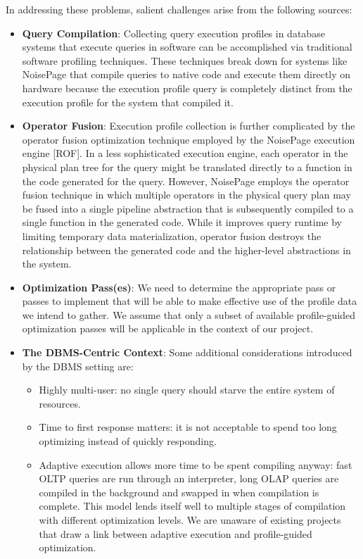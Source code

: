 \documentclass{vldb}
\begin{document}
In addressing these problems, salient challenges arise from the following sources:

\begin{itemize}
    \item \textbf{Query Compilation}: Collecting query execution profiles in database systems that execute queries in software can be accomplished via traditional software profiling techniques. These techniques break down for systems like NoisePage that compile queries to native code and execute them directly on hardware because the execution profile query is completely distinct from the execution profile for the system that compiled it.
    \item \textbf{Operator Fusion}: Execution profile collection is further complicated by the operator fusion optimization technique employed by the NoisePage execution engine [ROF]. In a less sophisticated execution engine, each operator in the physical plan tree for the query might be translated directly to a function in the code generated for the query. However, NoisePage employs the operator fusion technique in which multiple operators in the physical query plan may be fused into a single pipeline abstraction that is subsequently compiled to a single function in the generated code. While it improves query runtime by limiting temporary data materialization, operator fusion destroys the relationship between the generated code and the higher-level abstractions in the system.
    \item \textbf{Optimization Pass(es)}: We need to determine the appropriate pass or passes to implement that will be able to make effective use of the profile data we intend to gather. We assume that only a subset of available profile-guided optimization passes will be applicable in the context of our project.
    \item \textbf{The DBMS-Centric Context}: Some additional considerations introduced by the DBMS setting are:
    \begin{itemize}
        \item Highly multi-user: no single query should starve the entire system of resources.
        \item Time to first response matters: it is not acceptable to spend too long optimizing instead of quickly responding.
        \item Adaptive execution allows more time to be spent compiling anyway: fast OLTP queries are run through an interpreter, long OLAP queries are compiled in the background and swapped in when compilation is complete. This model lends itself well to multiple stages of compilation with different optimization levels. We are unaware of existing projects that draw a link between adaptive execution and profile-guided optimization.
    \end{itemize}
\end{itemize}
\end{document}
